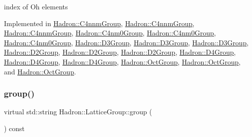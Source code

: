 index of Oh elements 

Implemented in \mbox{\hyperlink{structHadron_1_1C4nnmGroup_a8cbcb161ddf801e759797f231db35f75}{Hadron\+::\+C4nnm\+Group}}, \mbox{\hyperlink{structHadron_1_1C4nnmGroup_a8cbcb161ddf801e759797f231db35f75}{Hadron\+::\+C4nnm\+Group}}, \mbox{\hyperlink{structHadron_1_1C4nnmGroup_a8cbcb161ddf801e759797f231db35f75}{Hadron\+::\+C4nnm\+Group}}, \mbox{\hyperlink{structHadron_1_1C4nm0Group_a700a48f1865a634b774127d8710e1ecc}{Hadron\+::\+C4nm0\+Group}}, \mbox{\hyperlink{structHadron_1_1C4nm0Group_a700a48f1865a634b774127d8710e1ecc}{Hadron\+::\+C4nm0\+Group}}, \mbox{\hyperlink{structHadron_1_1C4nm0Group_a700a48f1865a634b774127d8710e1ecc}{Hadron\+::\+C4nm0\+Group}}, \mbox{\hyperlink{structHadron_1_1D3Group_a90ac88df35dd8e919637917dc22ee903}{Hadron\+::\+D3\+Group}}, \mbox{\hyperlink{structHadron_1_1D3Group_a90ac88df35dd8e919637917dc22ee903}{Hadron\+::\+D3\+Group}}, \mbox{\hyperlink{structHadron_1_1D3Group_a90ac88df35dd8e919637917dc22ee903}{Hadron\+::\+D3\+Group}}, \mbox{\hyperlink{structHadron_1_1D2Group_aa7676a51e002eb654648c4d84585d6da}{Hadron\+::\+D2\+Group}}, \mbox{\hyperlink{structHadron_1_1D2Group_aa7676a51e002eb654648c4d84585d6da}{Hadron\+::\+D2\+Group}}, \mbox{\hyperlink{structHadron_1_1D2Group_aa7676a51e002eb654648c4d84585d6da}{Hadron\+::\+D2\+Group}}, \mbox{\hyperlink{structHadron_1_1D4Group_aa4ca8a3f1bc6774b630cd6a354179298}{Hadron\+::\+D4\+Group}}, \mbox{\hyperlink{structHadron_1_1D4Group_aa4ca8a3f1bc6774b630cd6a354179298}{Hadron\+::\+D4\+Group}}, \mbox{\hyperlink{structHadron_1_1D4Group_aa4ca8a3f1bc6774b630cd6a354179298}{Hadron\+::\+D4\+Group}}, \mbox{\hyperlink{structHadron_1_1OctGroup_a1410a74894e1d12337548245c4e6fd47}{Hadron\+::\+Oct\+Group}}, \mbox{\hyperlink{structHadron_1_1OctGroup_a1410a74894e1d12337548245c4e6fd47}{Hadron\+::\+Oct\+Group}}, and \mbox{\hyperlink{structHadron_1_1OctGroup_a1410a74894e1d12337548245c4e6fd47}{Hadron\+::\+Oct\+Group}}.

\mbox{\label{structHadron_1_1LatticeGroup_a82208a322bf1b1db489f16af38e70087}} 
\subsubsection{\texorpdfstring{group()}{group()}\hspace{0.1cm}{\footnotesize\ttfamily [1/3]}}
{\footnotesize\ttfamily virtual std\+::string Hadron\+::\+Lattice\+Group\+::group (\begin{DoxyParamCaption}{ }\end{DoxyParamCaption}) const\hspace{0.3cm}{\ttfamily [pure virtual]}}

